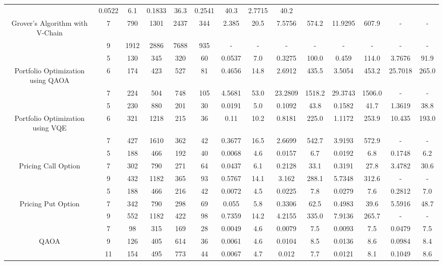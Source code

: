 \begin{table}[htb]
{\begin{tabular}{|c|c|c|c|c|c|c|c|c|c|c|c|c|c|}
 & 0.0522 & 6.1
 & 0.1833 & 36.3
 & 0.2541 & 40.3
 & 2.7715 & 40.2
 \\
Grover's Algorithm with V-Chain & 
7 & 790 & 1301 & 2437 & 344
 & 2.385 & 20.5
 & 7.5756 & 574.2
 & 11.9295 & 607.9
 & - & -
 \\
 & 
9 & 1912 & 2886 & 7688 & 935
 & - & -
 & - & -
 & - & -
 & - & -
 \\
\hline
 & 
5 & 130 & 345 & 320 & 60
 & 0.0537 & 7.0
 & 0.3275 & 100.0
 & 0.459 & 114.0
 & 3.7676 & 91.9
 \\
Portfolio Optimization using QAOA & 
6 & 174 & 423 & 527 & 81
 & 0.4656 & 14.8
 & 2.6912 & 435.5
 & 3.5054 & 453.2
 & 25.7018 & 265.0
 \\
 & 
7 & 224 & 504 & 748 & 105
 & 4.5681 & 53.0
 & 23.2809 & 1518.2
 & 29.3743 & 1506.0
 & - & -
 \\
\hline
 & 
5 & 230 & 880 & 201 & 30
 & 0.0191 & 5.0
 & 0.1092 & 43.8
 & 0.1582 & 41.7
 & 1.3619 & 38.8
 \\
Portfolio Optimization using VQE & 
6 & 321 & 1218 & 215 & 36
 & 0.11 & 10.2
 & 0.8181 & 225.0
 & 1.1172 & 253.9
 & 10.435 & 193.0
 \\
 & 
7 & 427 & 1610 & 362 & 42
 & 0.3677 & 16.5
 & 2.6699 & 542.7
 & 3.9193 & 572.9
 & - & -
 \\
\hline
 & 
5 & 188 & 466 & 192 & 40
 & 0.0068 & 4.6
 & 0.0157 & 6.7
 & 0.0192 & 6.8
 & 0.1748 & 6.2
 \\
Pricing Call Option & 
7 & 302 & 790 & 271 & 64
 & 0.0437 & 6.1
 & 0.2128 & 33.1
 & 0.3191 & 27.8
 & 3.4782 & 30.6
 \\
 & 
9 & 432 & 1182 & 365 & 93
 & 0.5767 & 14.1
 & 3.162 & 288.1
 & 5.7348 & 312.6
 & - & -
 \\
\hline
 & 
5 & 188 & 466 & 216 & 42
 & 0.0072 & 4.5
 & 0.0225 & 7.8
 & 0.0279 & 7.6
 & 0.2812 & 7.0
 \\
Pricing Put Option & 
7 & 342 & 790 & 298 & 69
 & 0.055 & 5.8
 & 0.3306 & 62.5
 & 0.4983 & 39.6
 & 5.5916 & 48.7
 \\
 & 
9 & 552 & 1182 & 422 & 98
 & 0.7359 & 14.2
 & 4.2155 & 335.0
 & 7.9136 & 265.7
 & - & -
 \\
\hline
 & 
7 & 98 & 315 & 169 & 28
 & 0.0049 & 4.6
 & 0.0079 & 7.5
 & 0.0093 & 7.5
 & 0.0479 & 7.5
 \\
QAOA & 
9 & 126 & 405 & 614 & 36
 & 0.0061 & 4.6
 & 0.0104 & 8.5
 & 0.0136 & 8.6
 & 0.0984 & 8.4
 \\
 & 
11 & 154 & 495 & 773 & 44
 & 0.0067 & 4.7
 & 0.012 & 7.7
 & 0.0121 & 8.1
 & 0.1049 & 8.6
 \\

\end{tabular}}
\end{table}
